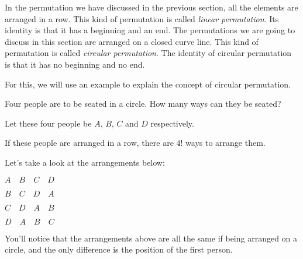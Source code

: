\documentclass{report}
\begin{document}
\begin{multicols}{2}
  In the permutation we have discussed in the previous section, all the elements
  are arranged in a row. This kind of permutation is called \textit{linear
    permutation}. Its identity is that it has a beginning and an end. The
  permutations we are going to discuss in this section are arranged on a closed
  curve line. This kind of permutation is called \textit{circular permutation}.
  The identity of circular permutation is that it has no beginning and no end.

  For this, we will use an example to explain the concept of circular
  permutation.

  Four people are to be seated in a circle. How many ways can they be seated?
  \sol{}

  Let these four people be $A$, $B$, $C$ and $D$ respectively.

  If these people are arranged in a row, there are $4!$ ways to arrange them.

  Let's take a look at the arrangements below:
  \begin{center}
    $A \quad B \quad C \quad D$

    $B \quad C \quad D \quad A$

    $C \quad D \quad A \quad B$

    $D \quad A \quad B \quad C$
  \end{center}
  You'll notice that the arrangements above are all the same if being arranged on
  a circle, and the only difference is the position of the first person.
  \begin{center}
    \hspace{1cm}
  \end{center}
  \begin{center}
    \hspace{1cm}
  \end{center}


\end{multicols}
\end{document}
